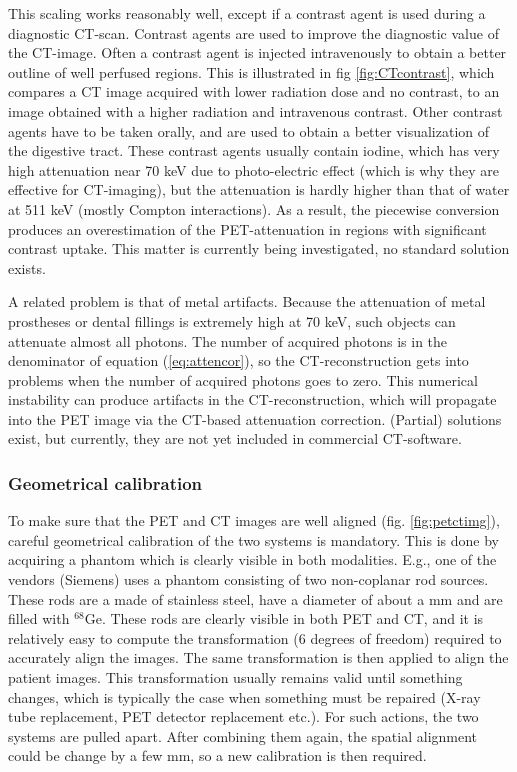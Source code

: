 \documentclass[11pt,oneside]{book}
\begin{document}
This scaling works reasonably well, except if a contrast agent is used
during a diagnostic CT-scan. Contrast agents are used to improve the
diagnostic value of the CT-image. Often a contrast agent is injected
intravenously to obtain a better outline of well perfused
regions. This is illustrated in fig \ref{fig:CTcontrast}, which
compares a CT image acquired with lower radiation dose and no
contrast, to an image obtained with a higher radiation and intravenous
contrast. Other contrast agents have to be taken orally, and are used
to obtain a better visualization of the digestive tract. These
contrast agents usually contain iodine, which has very high
attenuation near 70 keV due to photo-electric effect (which is why
they are effective for CT-imaging), but the attenuation is hardly
higher than that of water at 511 keV (mostly Compton interactions). As
a result, the piecewise conversion produces an overestimation of the
PET-attenuation in regions with significant contrast uptake. This
matter is currently being investigated, no standard solution exists.

A related problem is that of metal artifacts. Because the attenuation
of metal prostheses or dental fillings is extremely high at 70 keV,
such objects can attenuate almost all photons. The number of acquired
photons is in the denominator of equation (\ref{eq:attencor}), so the
CT-reconstruction gets into problems when the number of acquired
photons goes to zero. This numerical instability can produce artifacts
in the CT-reconstruction, which will propagate into the PET image via
the CT-based attenuation correction. (Partial) solutions exist, but
currently, they are not yet included in commercial CT-software.

\subsubsection{Geometrical calibration}
To make sure that the PET and CT images are well aligned
(fig. \ref{fig:petctimg}), careful geometrical calibration of the two
systems is mandatory. This is done by acquiring a phantom which is
clearly visible in both modalities. E.g., one of the vendors (Siemens)
uses a phantom consisting of two non-coplanar rod sources. These rods
are a made of stainless steel, have a diameter of about a mm and are
filled with $^{68}$Ge. These rods are clearly visible in both PET and
CT, and it is relatively easy to compute the transformation (6 degrees
of freedom) required to accurately align the images. The same
transformation is then applied to align the patient images. This
transformation usually remains valid until something changes, which is
typically the case when something must be repaired (X-ray tube
replacement, PET detector replacement etc.). For such actions, the two
systems are pulled apart. After combining them again, the spatial
alignment could be change by a few mm, so a new calibration is then
required.
\end{document}
